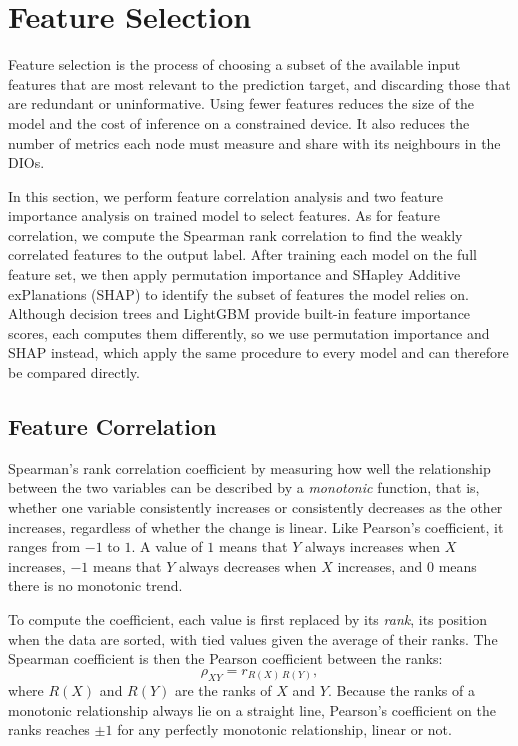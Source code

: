 \section{Feature Selection}
Feature selection is the process of choosing a subset of the available
input features that are most relevant to the prediction target, and
discarding those that are redundant or uninformative. Using fewer
features reduces the size of the model and the cost of inference on a
constrained device. It also
reduces the number of metrics each node must measure and share with
its neighbours in the DIOs.

In this section, we perform feature correlation analysis and two
feature importance analysis on trained model to select
features. As for feature correlation, we compute the
Spearman rank correlation to find the weakly correlated features to the
output label. After training each model on the full feature set, we then apply
permutation importance \cite{altmannPermutationImportanceCorrected2010}
and SHapley Additive exPlanations (SHAP)
\cite{lundbergUnifiedApproachInterpreting2017} to identify the subset
of features the model relies on.
Although decision trees and LightGBM provide built-in feature
importance scores, each computes them differently, so we use
permutation importance and SHAP instead, which apply the same
procedure to every model and can therefore be compared directly.

\subsection{Feature Correlation}
Spearman's rank correlation coefficient by measuring how well the
relationship between the two variables can be
described by a \emph{monotonic} function, that is, whether one
variable consistently increases or consistently decreases as the
other increases, regardless of whether the change is linear. Like
Pearson's coefficient, it ranges from $-1$ to $1$. A value of $1$
means that $Y$ always increases when $X$ increases, $-1$ means that
$Y$ always decreases when $X$ increases, and $0$ means there is no
monotonic trend.

To compute the coefficient, each value is first replaced by its
\emph{rank}, its position when the data are sorted, with tied values
given the average of their ranks. The Spearman coefficient is then
the Pearson coefficient between the ranks:
\begin{equation}
    \rho_{XY} = r_{R(X)\,R(Y)},
\end{equation}
where $R(X)$ and $R(Y)$ are the ranks of $X$ and $Y$. Because the
ranks of a monotonic relationship always lie on a straight line,
Pearson's coefficient on the ranks reaches $\pm 1$ for any perfectly
monotonic relationship, linear or not.

